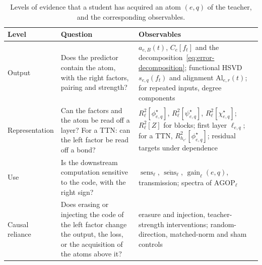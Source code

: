 \documentclass[11pt]{article}
\theoremstyle{definition}
\numberwithin{equation}{section}
\begin{document}
\begin{table}[t]
\centering
\small
\renewcommand{\arraystretch}{1.25}
\begin{tabular}{p{}p{}p{}}
\hline
\raggedright Level & \raggedright Question & \raggedright Observables \tabularnewline
\hline
\raggedright Output & \raggedright Does the predictor contain the atom, with the right factors, pairing and strength? & \raggedright $a_{e,B}(t)$, $C_e[f_t]$ and the decomposition~\eqref{eq:error-decomposition}; functional HSVD $s_{e,q}(f_t)$ and alignment $\mathrm{Al}_{e,r}(t)$; for repeated inputs, degree components \tabularnewline
\raggedright Representation & \raggedright Can the factors and the atom be read off a layer? For a TTN: can the left factor be read off a bond? & \raggedright $R^2_\ell[\phi^\star_{e,q}]$, $R^2_\ell[\psi^\star_{e,q}]$, $R^2_\ell[\chi^\star_{e,q}]$; $R^2_\ell[Z]$ for blocks; first layer $\ell_{e,q}$; for a TTN, $R^2_{h_{e'}}[\phi^\star_{e,q}]$; residual targets under dependence \tabularnewline
\raggedright Use & \raggedright Is the downstream computation sensitive to the code, with the right sign? & \raggedright $\operatorname{sens}_\ell$, $\overline{\operatorname{sens}}_\ell$, $\operatorname{gain}_\ell(e,q)$, transmission; spectra of $\mathrm{AGOP}_\ell$ \tabularnewline
\raggedright Causal reliance & \raggedright Does erasing or injecting the code of the left factor change the output, the loss, or the acquisition of the atoms above it? & \raggedright erasure and injection, teacher-strength interventions; random-direction, matched-norm and sham controls \tabularnewline
\hline
\end{tabular}
\caption{Levels of evidence that a student has acquired an atom $(e,q)$ of the teacher, and the corresponding observables.}
\label{tab:evidence}
\end{table}
\end{document}
